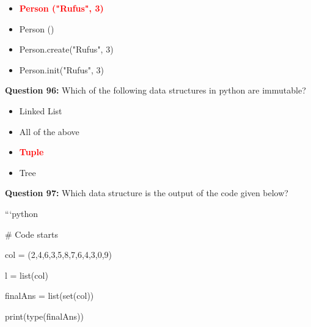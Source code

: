 \documentclass[12pt,a4paper]{article}
\begin{document}
\begin{itemize}
    \item[\textbf{A.}] \textcolor{red}{\textbf{Person ("Rufus", 3)}}
    \item[\textbf{B.}] Person ()
    \item[\textbf{C.}] Person.create("Rufus", 3)
    \item[\textbf{D.}] Person.init("Rufus", 3)
\end{itemize}

\vspace{0.5cm}

\textbf{Question 96:} Which of the following data structures in python are immutable?

\begin{itemize}
    \item[\textbf{A.}] Linked List
    \item[\textbf{B.}] All of the above
    \item[\textbf{C.}] \textcolor{red}{\textbf{Tuple}}
    \item[\textbf{D.}] Tree
\end{itemize}

\vspace{0.5cm}

\textbf{Question 97:} Which data structure is the output of the code given below?\newline

\newline
\newline

\newline
```python\newline

\newline
# Code starts\newline

\newline
col = (2,4,6,3,5,8,7,6,4,3,0,9)\newline

\newline
l = list(col)\newline

\newline
\newline

\newline
finalAns = list(set(col))\newline

\newline
print(type(finalAns))\newline
\end{document}
